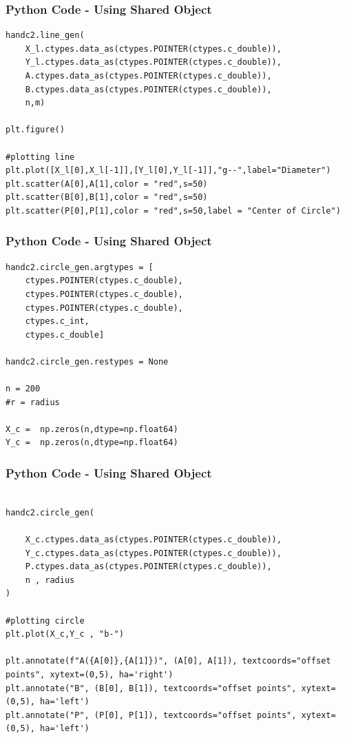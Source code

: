 \documentclass{beamer}
\begin{document}
\begin{frame}[fragile]
    \frametitle{Python Code - Using Shared Object}
    \begin{lstlisting}
handc2.line_gen(
    X_l.ctypes.data_as(ctypes.POINTER(ctypes.c_double)),
    Y_l.ctypes.data_as(ctypes.POINTER(ctypes.c_double)),
    A.ctypes.data_as(ctypes.POINTER(ctypes.c_double)),
    B.ctypes.data_as(ctypes.POINTER(ctypes.c_double)),
    n,m)
    
plt.figure()

#plotting line
plt.plot([X_l[0],X_l[-1]],[Y_l[0],Y_l[-1]],"g--",label="Diameter")
plt.scatter(A[0],A[1],color = "red",s=50)
plt.scatter(B[0],B[1],color = "red",s=50)
plt.scatter(P[0],P[1],color = "red",s=50,label = "Center of Circle")
\end{lstlisting}
\end{frame}

\begin{frame}[fragile]
    \frametitle{Python Code - Using Shared Object}
    \begin{lstlisting}
handc2.circle_gen.argtypes = [
    ctypes.POINTER(ctypes.c_double),
    ctypes.POINTER(ctypes.c_double),
    ctypes.POINTER(ctypes.c_double),
    ctypes.c_int,
    ctypes.c_double]

handc2.circle_gen.restypes = None

n = 200
#r = radius 

X_c =  np.zeros(n,dtype=np.float64)
Y_c =  np.zeros(n,dtype=np.float64)
\end{lstlisting}
\end{frame}

\begin{frame}[fragile]
    \frametitle{Python Code - Using Shared Object}
    \begin{lstlisting}

handc2.circle_gen(

    X_c.ctypes.data_as(ctypes.POINTER(ctypes.c_double)),
    Y_c.ctypes.data_as(ctypes.POINTER(ctypes.c_double)),
    P.ctypes.data_as(ctypes.POINTER(ctypes.c_double)),
    n , radius
)

#plotting circle
plt.plot(X_c,Y_c , "b-")

plt.annotate(f"A({A[0]},{A[1]})", (A[0], A[1]), textcoords="offset points", xytext=(0,5), ha='right')
plt.annotate("B", (B[0], B[1]), textcoords="offset points", xytext=(0,5), ha='left')
plt.annotate("P", (P[0], P[1]), textcoords="offset points", xytext=(0,5), ha='left')
\end{lstlisting}
\end{frame}
\end{document}

